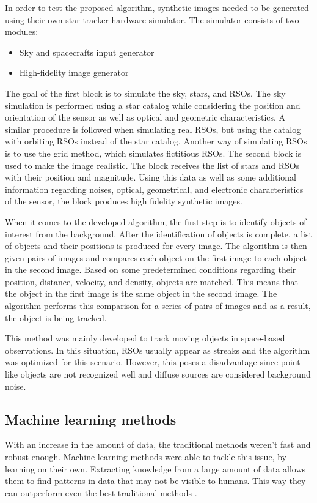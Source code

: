 In order to test the proposed algorithm, synthetic images needed to be generated using their own star-tracker hardware simulator. 
The simulator consists of two modules:
\begin{itemize}
    \item Sky and spacecrafts input generator
    \item High-fidelity image generator

\end{itemize}

The goal of the first block is to simulate the sky, stars, and RSOs. The sky simulation is performed using a star catalog while considering the position and orientation of the sensor as well as optical and geometric characteristics. A similar procedure is followed when simulating real RSOs, but using the catalog with orbiting RSOs instead of the star catalog. Another way of simulating RSOs is to use the grid method, which simulates fictitious RSOs. 
The second block is used to make the image realistic. The block receives the list of stars and RSOs with their position and magnitude. Using this data as well as some additional information regarding noises, optical, geometrical, and electronic characteristics of the sensor, the block produces high fidelity synthetic images. 

When it comes to the developed algorithm, the first step is to identify objects of interest from the background. After the identification of objects is complete, a list of objects and their positions is produced for every image. 
The algorithm is then given pairs of images and compares each object on the first image to each object in the second image. Based on some predetermined conditions regarding their position, distance, velocity, and density, objects are matched. This means that the object in the first image is the same object in the second image. The algorithm performs this comparison for a series of pairs of images and as a result, the object is being tracked.

This method was mainly developed to track moving objects in space-based observations. In this situation, RSOs usually appear as streaks and the algorithm was optimized for this scenario. However, this poses a disadvantage since point-like objects are not recognized well and diffuse sources are considered background noise. 

\subsection{Machine learning methods}
With an increase in the amount of data, the traditional methods weren't fast and robust enough. Machine learning methods were able to tackle this issue, by learning on their own. Extracting knowledge from a large amount of data allows them to find patterns in data that may not be visible to humans. This way they can outperform even the best traditional methods \cite{Goodfellow-et-al-2016}.

